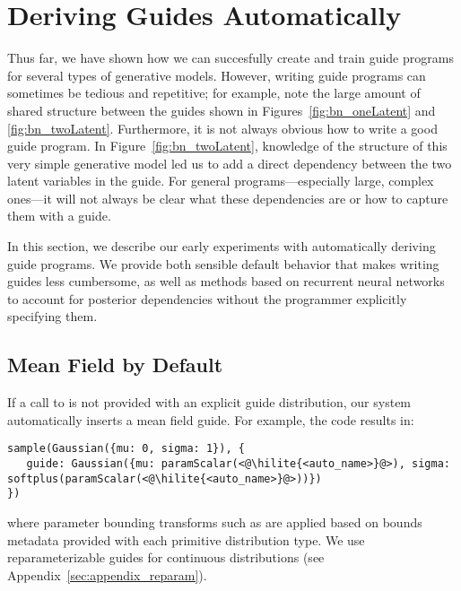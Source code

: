 \section{Deriving Guides Automatically}
\label{sec:autoGuide}

Thus far, we have shown how we can succesfully create and train guide programs for several types of generative models. However, writing guide programs can sometimes be tedious and repetitive; for example, note the large amount of shared structure between the guides shown in Figures~\ref{fig:bn_oneLatent} and \ref{fig:bn_twoLatent}. Furthermore, it is not always obvious how to write a good guide program. In Figure~\ref{fig:bn_twoLatent}, knowledge of the structure of this very simple generative model led us to add a direct dependency between the two latent variables in the guide. For general programs---especially large, complex ones---it will not always be clear what these dependencies are or how to capture them with a guide.

In this section, we describe our early experiments with automatically deriving guide programs. We provide both sensible default behavior that makes writing guides less cumbersome, as well as methods based on recurrent neural networks to account for posterior dependencies without the programmer explicitly specifying them.


\subsection{Mean Field by Default}

If a call to  is not provided with an explicit guide distribution, our system automatically inserts a mean field guide. For example, the code  results in:
\begin{lstlisting}
sample(Gaussian({mu: 0, sigma: 1}), {
   guide: Gaussian({mu: paramScalar(<@\hilite{<auto_name>}@>), sigma: softplus(paramScalar(<@\hilite{<auto_name>}@>))})
})
\end{lstlisting}
where parameter bounding transforms such as  are applied based on bounds metadata provided with each primitive distribution type. We use reparameterizable guides for continuous distributions (see Appendix~\ref{sec:appendix_reparam}).

